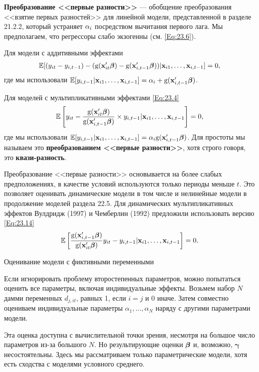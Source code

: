 \textbf{Преобразование <<первые разности>>} --- обобщение преобразования <<взятие первых разностей>> для линейной модели, представленной в разделе 21.2.2, который устраняет $\alpha_i$  посредством вычитания первого лага. Мы предполагаем, что регрессоры слабо экзогенны (см. \ref{Eq:23.6}).

Для модели с аддитивными эффектами
\begin{align}
\mathbb{E}[(y_{it}-y_{i,t-1})-(\mathrm g(\mathbf{x}'_{it}\bm{\beta})-\mathrm g(\mathbf{x}'_{i,t-1}\bm{\beta}))|\mathbf{x}_{i1},\dots,\mathbf{x}_{i,t-1}]=0,
\label{Eq:23.13}
\end{align}
где мы использовали $\mathbb{E}[y_{i,t-1}|\mathbf{x}_{i1}, \dots, \mathbf{x}_{i,t-1}]=\alpha_i+\mathrm g(\mathbf{x}'_{i,t-1}\bm{\beta})$.

Для моделей с мультипликативными эффектами \ref{Eq:23.4}
\begin{align}
\mathbb{E}\left[ y_{it}-\frac{\mathrm g(\mathbf{x}'_{it}\bm{\beta})}{\mathrm g(\mathbf{x}'_{i,t-1}\bm{\beta})}\times y_{i,t-1}|\mathbf{x}_{i1}, \dots, \mathbf{x}_{i,t-1} \right]=0,
\label{Eq:23.14}
\end{align}
где мы использовали $\mathbb{E}[y_{i,t-1}|\mathbf{x}_{i1}, \dots, \mathbf{x}_{i,t-1}]=\alpha_i \mathrm g(\mathbf{x}'_{i,t-1}\bm{\beta})$. Для простоты мы называем это \textbf{преобразованием <<первые разности>>}, хотя строго говоря, это \textbf{квази-разность}.

Преобразование <<первые разности>> основывается на более слабых предположениях, в качестве условий используются только периоды меньше $t$. Это позволяет оценивать динамические модели в том числе и нелинейные модели в продолжение моделей раздела 22.5. Для динамических мультипликативных эффектов Вулдридж (1997) и Чемберлин (1992) предложили использовать версию \ref{Eq:23.14}
\begin{align}
\mathbb{E}\left[ \frac{\mathrm g(\mathbf{x}'_{i,t-1}\bm{\beta})}{\mathrm g(\mathbf{x}'_{it}\bm{\beta})}y_{it}-y_{i,t-1}|\mathbf{x}_{i1}, \dots, \mathbf{x}_{i,t-1} \right]=0.
\label{Eq:23.15}
\end{align}

{\centering Оценивание модели с фиктивными переменными \\}

Если игнорировать проблему второстепенных параметров, можно попытаться оценить все параметры, включая индивидуальные эффекты. Возьмем набор $N$ дамми переменных $d_{j,it}$, равных 1, если $i=j$ и 0 иначе. Затем совместно оцениваем индивидуальные параметры $\alpha_1, \dots, \alpha_N$ наряду с другими параметрами модели.

Эта оценка доступна с вычислительной точки зрения, несмотря на большое число параметров из-за большого $N$. Но результирующие оценки $\bm{\beta}$ и, возможно, $\bm\gamma$ несостоятельны. Здесь мы рассматриваем только параметрические модели, хотя есть сходства с моделями условного среднего.

